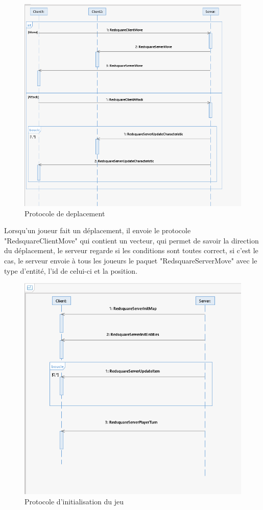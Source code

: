 \documentclass[a4paper, 12pt]{article}
\begin{document}
\begin{figure}[H]
    \includegraphics[scale=0.65]{./Diagramme/Deplacement}
    \caption{Protocole de deplacement}
\end{figure}
Lorsqu'un joueur fait un déplacement, il envoie le protocole "RedsquareClientMove" qui contient un vecteur, qui permet de savoir la direction du déplacement, le serveur regarde si les conditions sont toutes correct, si c'est le cas, le serveur envoie à tous les joueurs le paquet "RedsquareServerMove" avec le type d'entité, l'id de celui-ci et la position.
\newpage
\begin{figure}[H]
    \includegraphics[scale=0.65]{./Diagramme/Jeu}
    \caption{Protocole d'initialisation du jeu}
\end{figure}
\end{document}
